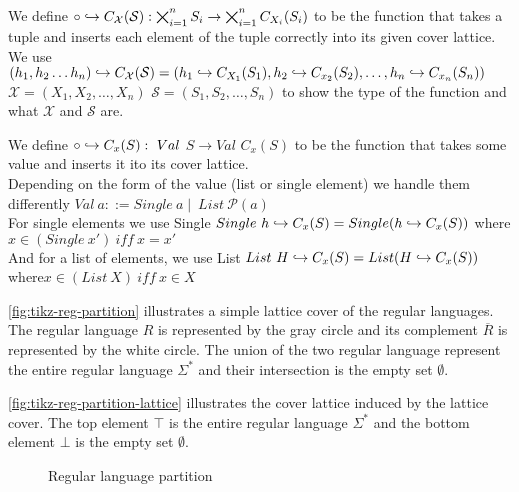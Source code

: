 \begin{definition}
    We define $\circ \hookrightarrow C_\mathcal{X}(\mathcal{S}): \bigtimes_{i = 1}^{n} S_i \rightarrow \bigtimes_{i = 1}^{n} C_{X_i}(S_i)$ to be the function that takes a tuple and inserts each element of the tuple correctly into its given cover lattice.
    We use $(h_1, h_2 \dots h_n)\hookrightarrow C_{\mathcal{X}}(\mathcal{S})=(h_1 \hookrightarrow C_{X_1}(S_1), h_2\hookrightarrow C_{x_2}(S_2), \dots, h_n \hookrightarrow C_{x_n}(S_n))$
    $\mathcal{X}=(X_1, X_2, \dots, X_n)$
    $\mathcal{S}=(S_1, S_2, \dots, S_n)$ to show the type of the function and what $\mathcal{X}$ and $\mathcal{S}$ are.
\end{definition}

\begin{definition}
    We define $\circ \into C_x(S): \ Val$ $S \rightarrow Val$ $C_x(S)$ to be the function that takes some value and inserts it ito its cover lattice. \\
    Depending on the form of the value (list or single element) we handle them differently $Val \ a ::= Single \ a \mid \ List \ \mathcal{P}(a)$ \\
    For single elements we use Single $Single \ h \hookrightarrow C_x(S) = Single(h\hookrightarrow C_x(S))$ where $x \in (Single \ x') \ iff \ x = x'$ \\
    And for a list of elements, we use List $List \ H \hookrightarrow C_x(S)=List(H\hookrightarrow C_x(S))$ where$x \in (List \ X) \ iff \ x \in X$ \\
\end{definition}


\begin{example}
    \autoref{fig:tikz-reg-partition} illustrates a simple lattice cover of the regular languages.
    The regular language $R$ is represented by the gray circle and its complement $\overline{R}$ is represented by the white circle.
    The union of the two regular language represent the entire regular language $\Sigma^*$ and their intersection is the empty set $\emptyset$.

    \autoref{fig:tikz-reg-partition-lattice} illustrates the cover lattice induced by the lattice cover.
    The top element $\top$ is the entire regular language $\Sigma^*$ and the bottom element $\bot$ is the empty set $\emptyset$.
\end{example}

\begin{figure}
    \center
    
    \caption{Regular language partition}
    \label{fig:tikz-reg-partition}
\end{figure}


